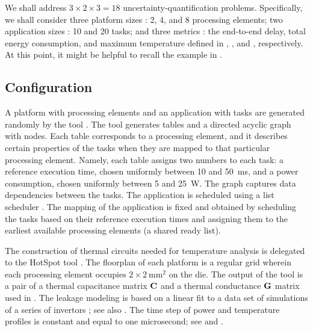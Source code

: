 We shall address $3 \times 2 \times 3 = 18$ uncertainty-quantification problems.
Specifically, we shall consider three platform sizes \np: 2, 4, and 8 processing
elements; two application sizes \nt: 10 and 20 tasks; and three metrics \g: the
end-to-end delay, total energy consumption, and maximum temperature defined in
, , and ,
respectively. At this point, it might be helpful to recall the example in
.

\subsection{Configuration}

A platform with \np processing elements and an application with \nt tasks are
generated randomly by the  tool \cite{dick1998}. The tool generates \np
tables and a directed acyclic graph with \nt nodes. Each table corresponds to a
processing element, and it describes certain properties of the tasks when they
are mapped to that particular processing element. Namely, each table assigns two
numbers to each task: a reference execution time, chosen uniformly between 10
and 50~ms, and a power consumption, chosen uniformly between 5 and 25~W. The
graph captures data dependencies between the tasks. The application is scheduled
using a list scheduler \cite{adam1974}. The mapping of the application is fixed
and obtained by scheduling the tasks based on their reference execution times
and assigning them to the earliest available processing elements (a shared ready
list).

The construction of thermal  circuits needed for temperature analysis is
delegated to the HotSpot tool \cite{skadron2003}. The floorplan of each platform
is a regular grid wherein each processing element occupies $2 \times
2~\text{mm}^2$ on the die. The output of the tool is a pair of a thermal
capacitance matrix $\mathbf{C}$ and a thermal conductance $\mathbf{G}$ matrix used in
. The leakage modeling is based on a linear fit to a data
set of  simulations of a series of  invertors
\cite{ukhov2012, liu2007}; see also \cite{ukhov2014}. The time step of power and
temperature profiles is constant and equal to one microsecond; see 
and .

